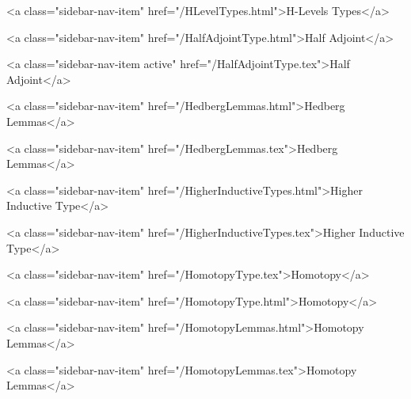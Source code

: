       
        
          <a class="sidebar-nav-item" href="/HLevelTypes.html">H-Levels Types</a>
        
      
    
      
        
          <a class="sidebar-nav-item" href="/HalfAdjointType.html">Half Adjoint</a>
        
      
    
      
        
          <a class="sidebar-nav-item active" href="/HalfAdjointType.tex">Half Adjoint</a>
        
      
    
      
        
          <a class="sidebar-nav-item" href="/HedbergLemmas.html">Hedberg Lemmas</a>
        
      
    
      
        
          <a class="sidebar-nav-item" href="/HedbergLemmas.tex">Hedberg Lemmas</a>
        
      
    
      
        
          <a class="sidebar-nav-item" href="/HigherInductiveTypes.html">Higher Inductive Type</a>
        
      
    
      
        
          <a class="sidebar-nav-item" href="/HigherInductiveTypes.tex">Higher Inductive Type</a>
        
      
    
      
        
          <a class="sidebar-nav-item" href="/HomotopyType.tex">Homotopy</a>
        
      
    
      
        
          <a class="sidebar-nav-item" href="/HomotopyType.html">Homotopy</a>
        
      
    
      
        
          <a class="sidebar-nav-item" href="/HomotopyLemmas.html">Homotopy Lemmas</a>
        
      
    
      
        
          <a class="sidebar-nav-item" href="/HomotopyLemmas.tex">Homotopy Lemmas</a>
        
